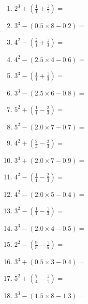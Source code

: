 \documentclass[12pt]{article}
\begin{document}
\begin{enumerate}
\item \large $ 2^{3} + (\frac{1}{1} + \frac{1}{1}) = $ \vspace{1.6cm}
\item \large $ 3^{3} - (0.5 \times 8 - 0.2) = $ \vspace{1.6cm}
\item \large $ 4^{2} - (\frac{2}{1} + \frac{1}{3}) = $ \vspace{1.6cm}
\item \large $ 4^{2} - (2.5 \times 4 - 0.6) = $ \vspace{1.6cm}
\newpage
\item \large $ 3^{3} - (\frac{1}{1} + \frac{1}{3}) = $ \vspace{1.6cm}
\item \large $ 3^{3} - (2.5 \times 6 - 0.8) = $ \vspace{1.6cm}
\item \large $ 5^{2} + (\frac{1}{1} - \frac{2}{3}) = $ \vspace{1.6cm}
\item \large $ 5^{2} - (2.0 \times 7 - 0.7) = $ \vspace{1.6cm}
\item \large $ 4^{2} + (\frac{2}{3} - \frac{2}{3}) = $ \vspace{1.6cm}
\item \large $ 3^{3} + (2.0 \times 7 - 0.9) = $ \vspace{1.6cm}
\item \large $ 4^{2} - (\frac{1}{1} - \frac{2}{3}) = $ \vspace{1.6cm}
\item \large $ 4^{2} - (2.0 \times 5 - 0.4) = $ \vspace{1.6cm}
\item \large $ 3^{2} - (\frac{1}{1} - \frac{1}{3}) = $ \vspace{1.6cm}
\item \large $ 3^{3} - (2.0 \times 4 - 0.5) = $ \vspace{1.6cm}
\newpage
\item \large $ 2^{2} - (\frac{9}{5} - \frac{1}{5}) = $ \vspace{1.6cm}
\item \large $ 3^{3} + (0.5 \times 3 - 0.4) = $ \vspace{1.6cm}
\item \large $ 5^{2} + (\frac{7}{4} - \frac{1}{1}) = $ \vspace{1.6cm}
\item \large $ 3^{3} - (1.5 \times 8 - 1.3) = $ \vspace{1.6cm}

\end{enumerate}
\end{document}

